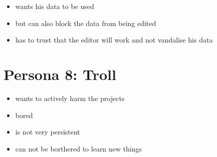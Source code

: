 \documentclass{article}
\begin{document}
\begin{itemize}
 \item wants his data to be used
 \item but can also block the data from being edited
 \item has to trust that the editor will work and not vandalise his data
\end{itemize}

\section{Persona 8: Troll}

\begin{itemize}
 \item wants to actively harm the projects
 \item bored
 \item is not very persistent
 \item can not be borthered to learn new things
\end{itemize}
\end{document}
